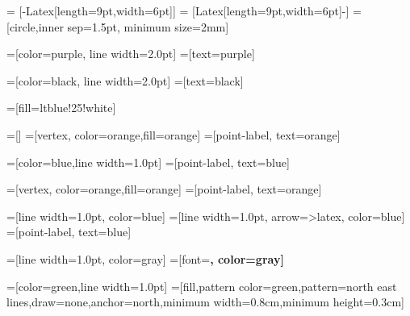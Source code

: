%
%


\usetikzlibrary{positioning,arrows.meta,shapes,calc,patterns}

 = [-{Latex[length=9pt,width=6pt]}]
 = [{Latex[length=9pt,width=6pt]}-]
=[circle,inner sep=1.5pt, minimum size=2mm]

=[color=purple, line width=2.0pt]
=[text=purple]

=[color=black, line width=2.0pt]
=[text=black]

=[fill=ltblue!25!white]

=[]
=[vertex, color=orange,fill=orange]
=[point-label, text=orange]

=[color=blue,line width=1.0pt]
=[point-label, text=blue]


=[vertex, color=orange,fill=orange]
=[point-label, text=orange]

=[line width=1.0pt, color=blue]
=[line width=1.0pt, arrow=>latex, color=blue]
=[point-label, text=blue]


=[line width=1.0pt, color=gray]
=[font=\bfseries, color=gray]


=[color=green,line width=1.0pt]
=[fill,pattern color=green,pattern=north east lines,draw=none,anchor=north,minimum width=0.8cm,minimum height=0.3cm]


